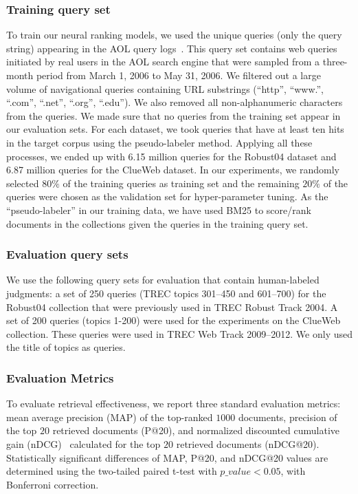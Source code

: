 \subsubsection{Training query set}
\label{sec:query_set}
To train our neural ranking models, we used the unique queries (only the query string) appearing in the AOL query logs~\citep{Pass:2006}. This query set contains web queries initiated by real users in the AOL search engine that were sampled from a three-month period from March 1, 2006 to May 31, 2006. We filtered out a large volume of navigational queries containing URL substrings (``http'', ``www.'', ``.com'', ``.net'', ``.org'', ``.edu''). We also removed all non-alphanumeric characters from the queries. We made sure that no queries from the training set appear in our evaluation sets. For each dataset, we took queries that have at least ten hits in the target corpus using the pseudo-labeler method. Applying all these processes, we ended up with 6.15 million queries for the Robust04 dataset and 6.87 million queries for the ClueWeb dataset. 
In our experiments, we randomly selected $80\%$ of the training queries as training set and the remaining $20\%$ of the queries were chosen as the validation set for hyper-parameter tuning. As the ``pseudo-labeler'' in our training data, we have used BM25 to score/rank documents in the collections given the queries in the training query set.

\subsubsection{Evaluation query sets} 
We use the following query sets for evaluation that contain human-labeled judgments: a set of 250 queries (TREC topics 301--450 and 601--700) for the Robust04 collection that were previously used in TREC Robust Track 2004. A set of 200 queries (topics 1-200) were used for the experiments on the ClueWeb collection. These queries were used in TREC Web Track 2009--2012. We only used the title of topics as queries.

\subsubsection{Evaluation Metrics}
To evaluate retrieval effectiveness, we report three standard evaluation metrics: mean average precision (MAP) of the top-ranked $1000$ documents, precision of the top $20$ retrieved documents (P@20), and normalized discounted cumulative gain (nDCG)~\citep{Jarvelin:2002} calculated for the top $20$ retrieved documents (nDCG@20). Statistically significant differences of MAP, P@20, and nDCG@20 values are determined using the two-tailed paired t-test with $p\_value<0.05$, with Bonferroni correction.


